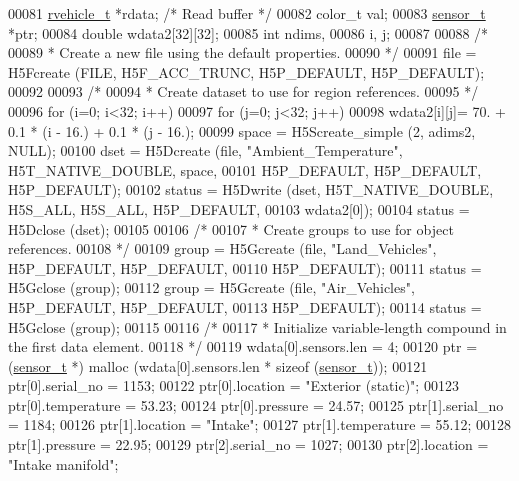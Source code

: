 \begin{DoxyCode}
00081     \hyperlink{structrvehicle__t}{rvehicle\_t}  *rdata;                     \textcolor{comment}{/* Read buffer */}
00082     color\_t     val;
00083     \hyperlink{structsensor__t}{sensor\_t}    *ptr;
00084     \textcolor{keywordtype}{double}      wdata2[32][32];
00085     \textcolor{keywordtype}{int}         ndims,
00086                 i, j;
00087 
00088     \textcolor{comment}{/*}
00089 \textcolor{comment}{     * Create a new file using the default properties.}
00090 \textcolor{comment}{     */}
00091     file = H5Fcreate (FILE, H5F\_ACC\_TRUNC, H5P\_DEFAULT, H5P\_DEFAULT);
00092 
00093     \textcolor{comment}{/*}
00094 \textcolor{comment}{     * Create dataset to use for region references.}
00095 \textcolor{comment}{     */}
00096     \textcolor{keywordflow}{for} (i=0; i<32; i++)
00097         \textcolor{keywordflow}{for} (j=0; j<32; j++)
00098             wdata2[i][j]= 70. + 0.1 * (i - 16.) + 0.1 * (j - 16.);
00099     space = H5Screate\_simple (2, adims2, NULL);
00100     dset = H5Dcreate (file, \textcolor{stringliteral}{"Ambient\_Temperature"}, H5T\_NATIVE\_DOUBLE, space,
00101                 H5P\_DEFAULT, H5P\_DEFAULT, H5P\_DEFAULT);
00102     status = H5Dwrite (dset, H5T\_NATIVE\_DOUBLE, H5S\_ALL, H5S\_ALL, H5P\_DEFAULT,
00103                 wdata2[0]);
00104     status = H5Dclose (dset);
00105 
00106     \textcolor{comment}{/*}
00107 \textcolor{comment}{     * Create groups to use for object references.}
00108 \textcolor{comment}{     */}
00109     group = H5Gcreate (file, \textcolor{stringliteral}{"Land\_Vehicles"}, H5P\_DEFAULT, H5P\_DEFAULT,
00110                 H5P\_DEFAULT);
00111     status = H5Gclose (group);
00112     group = H5Gcreate (file, \textcolor{stringliteral}{"Air\_Vehicles"}, H5P\_DEFAULT, H5P\_DEFAULT,
00113                 H5P\_DEFAULT);
00114     status = H5Gclose (group);
00115 
00116     \textcolor{comment}{/*}
00117 \textcolor{comment}{     * Initialize variable-length compound in the first data element.}
00118 \textcolor{comment}{     */}
00119     wdata[0].sensors.len = 4;
00120     ptr = (\hyperlink{structsensor__t}{sensor\_t} *) malloc (wdata[0].sensors.len * sizeof (\hyperlink{structsensor__t}{sensor\_t}));
00121     ptr[0].serial\_no = 1153;
00122     ptr[0].location = \textcolor{stringliteral}{"Exterior (static)"};
00123     ptr[0].temperature = 53.23;
00124     ptr[0].pressure = 24.57;
00125     ptr[1].serial\_no = 1184;
00126     ptr[1].location = \textcolor{stringliteral}{"Intake"};
00127     ptr[1].temperature = 55.12;
00128     ptr[1].pressure = 22.95;
00129     ptr[2].serial\_no = 1027;
00130     ptr[2].location = \textcolor{stringliteral}{"Intake manifold"};

\end{DoxyCode}
